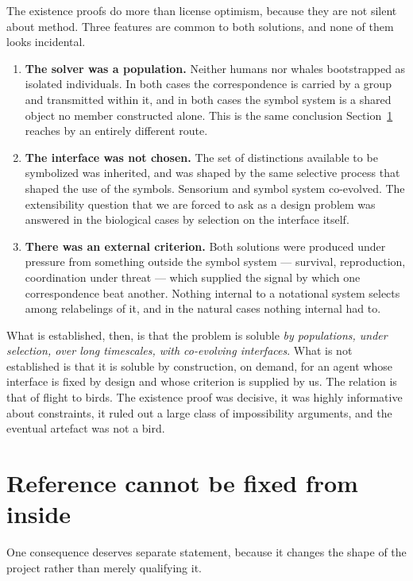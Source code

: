 \noindent
The existence proofs do more than license optimism, because they
are not silent about method.
Three features are common to both solutions, and none of them looks
incidental.

\begin{enumerate}[label=(\roman*),leftmargin=2.2em]
\item \textbf{The solver was a population.}
Neither humans nor whales bootstrapped as isolated individuals.
In both cases the correspondence is carried by a group and
transmitted within it, and in both cases the symbol system is a
shared object no member constructed alone.
This is the same conclusion Section~\ref{sec:social} reaches by an
entirely different route.
\item \textbf{The interface was not chosen.}
The set of distinctions available to be symbolized was inherited,
and was shaped by the same selective process that shaped the use of
the symbols.
Sensorium and symbol system co-evolved.
The extensibility question that we are forced to ask as a design
problem was answered in the biological cases by selection on the
interface itself.
\item \textbf{There was an external criterion.}
Both solutions were produced under pressure from something outside
the symbol system --- survival, reproduction, coordination under
threat --- which supplied the signal by which one correspondence
beat another.
Nothing internal to a notational system selects among relabelings
of it, and in the natural cases nothing internal had to.
\end{enumerate}

\noindent
What is established, then, is that the problem is soluble \emph{by
populations, under selection, over long timescales, with
co-evolving interfaces}.
What is not established is that it is soluble by construction, on
demand, for an agent whose interface is fixed by design and whose
criterion is supplied by us.
The relation is that of flight to birds.
The existence proof was decisive, it was highly informative about
constraints, it ruled out a large class of impossibility arguments,
and the eventual artefact was not a bird.

\section{Reference cannot be fixed from inside}
\label{sec:social}

One consequence deserves separate statement, because it changes the
shape of the project rather than merely qualifying it.

